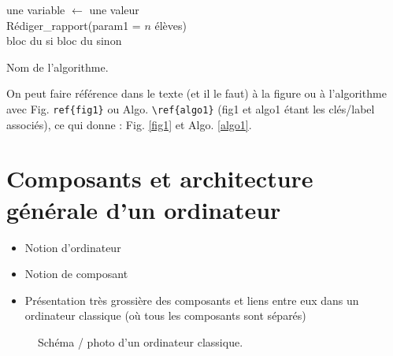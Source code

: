 \documentclass[a4paper,11pt]{article}
\begin{document}
\begin{center}
\begin{algorithm}[h!]
%
\BlankLine
{}
une variable $\leftarrow$ une valeur\\ %
Rédiger\_rapport(param1 = $n$ élèves)\\ %
  {bloc du si}
  {bloc du sinon}
\caption{Nom de l'algorithme.}
\label{algo1}
\end{algorithm}
\end{center}

On peut faire référence dans le texte (et il le faut) à la figure ou à l'algorithme avec Fig. \verb!ref{fig1}! ou Algo. \verb!\ref{algo1}! (fig1 et algo1 étant les clés/label associés), ce qui donne : Fig. \ref{fig1} et Algo. \ref{algo1}.

\section{Composants et architecture générale d'un ordinateur}

\begin{itemize}
\item Notion d'ordinateur
\item Notion de composant
\item Présentation très grossière des composants et liens entre eux dans un ordinateur classique (où tous les composants sont \og séparés\fg)
\end{itemize}


\begin{figure}[!h]
\begin{center}
  \caption{Schéma / photo d'un ordinateur classique.}
  \label{etiquette_de_la_figure_pour_y_faire_reference_plus_tard}
\end{center}
\end{figure}
\end{document}
